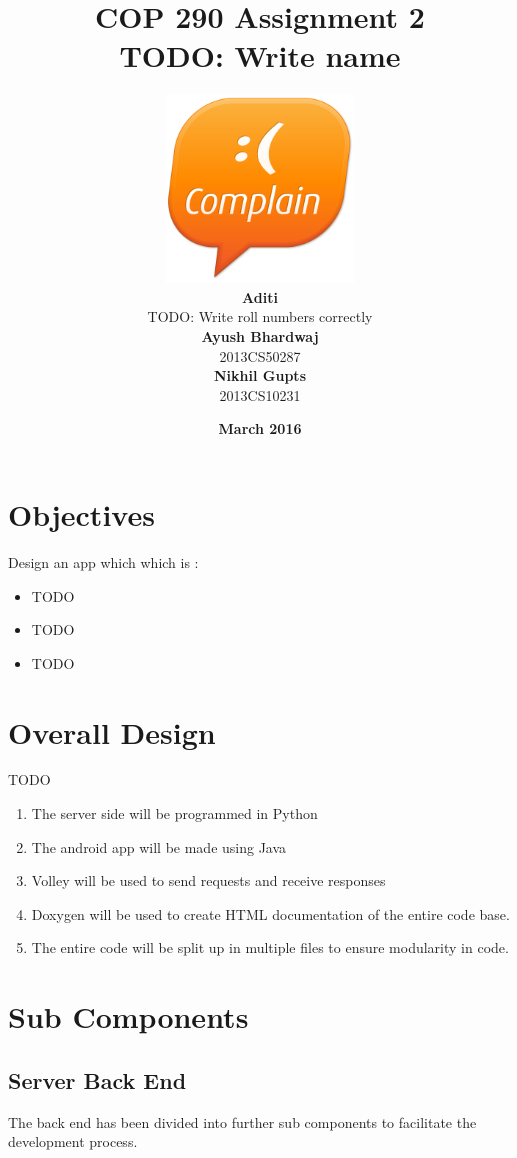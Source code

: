 \documentclass{article}
\title{\vspace*{\fill} \textbf{COP 290 Assignment 2}
	  \\ {\Large \textbf{TODO: Write name}}
}
\author{
	\vspace{5mm} \includegraphics[width=5cm]{logo.png} \\
	 \textbf{Aditi}\\
	TODO: Write roll numbers correctly \vspace{2mm} \\
	\textbf{Ayush Bhardwaj}\\ 
	2013CS50287 \vspace{2mm} \\
	\textbf{Nikhil Gupts}\\ 
	2013CS10231 \vspace{2mm}
}
\date{\vspace{3mm} \textbf{March 2016} \vspace*{\fill}}
\begin{document}
	\maketitle

	\newpage

	\tableofcontents

	\newpage

	\section{Objectives}
		Design an app which which is :
		\begin{itemize}
			\item TODO
			\item TODO
			\item TODO
		\end{itemize}
	\section{Overall Design}
		TODO
		\begin{enumerate}
			\item The server side will be programmed in Python
			\item The android app will be made using Java
			\item Volley will be used to send requests and receive responses
			\item Doxygen will be used to create HTML documentation of the entire code base.
			\item The entire code will be split up in multiple files to ensure modularity in code.
		\end{enumerate}

	\section{Sub Components}
			\subsection{Server Back End}
				The back end has been divided into further sub components to facilitate the development process.
\end{document}
